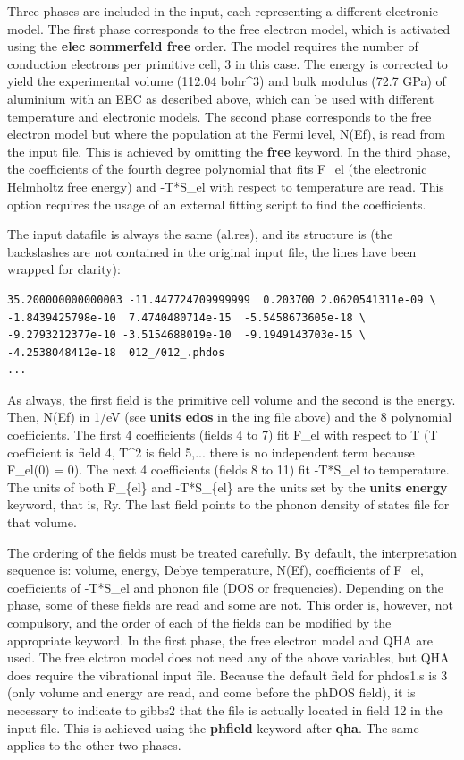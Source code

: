 \documentclass[a4paper]{article}
\begin{document}
Three phases are included in the input, each representing a different
electronic model. The first phase corresponds to the free electron
model, which is activated using the \textbf{elec sommerfeld free}
order. The model requires the number of conduction electrons per
primitive cell, 3 in this case. The energy is corrected to yield the
experimental volume (112.04 bohr\textasciicircum{}3) and bulk modulus (72.7 GPa) of
aluminium with an EEC as described above, which can be used with
different temperature and electronic models. The second phase
corresponds to the free electron model but where the population at the
Fermi level, N(Ef), is read from the input file. This is achieved by
omitting the \textbf{free} keyword. In the third phase, the coefficients of
the fourth degree polynomial that fits F\_el (the electronic Helmholtz
free energy) and -T*S\_el with respect to temperature are read. This
option requires the usage of an external fitting script to find the
coefficients.

The input datafile is always the same (al.res), and its structure is
(the backslashes are not contained in the original input file, the
lines have been wrapped for clarity):
%
\asciilist
\begin{lstlisting}
35.200000000000003 -11.447724709999999  0.203700 2.0620541311e-09 \
-1.8439425798e-10  7.4740480714e-15  -5.5458673605e-18 \
-9.2793212377e-10 -3.5154688019e-10  -9.1949143703e-15 \
-4.2538048412e-18  012_/012_.phdos
...
\end{lstlisting}

As always, the first field is the primitive cell volume and the second
is the energy. Then, N(Ef) in 1/eV (see \textbf{units edos} in the ing
file above) and the 8 polynomial coefficients. The first 4
coefficients (fields 4 to 7) fit F\_el with respect to T (T coefficient
is field 4, T\textasciicircum{}2 is field 5,... there is no independent term because
F\_el(0) = 0). The next 4 coefficients (fields 8 to 11) fit -T*S\_el to
temperature. The units of both F\_\{el\} and -T*S\_\{el\} are the units set
by the \textbf{units energy} keyword, that is, Ry. The last field points to
the phonon density of states file for that volume.

The ordering of the fields must be treated carefully. By default, the
interpretation sequence is: volume, energy, Debye temperature, N(Ef),
coefficients of F\_el, coefficients of -T*S\_el and phonon file (DOS or
frequencies). Depending on the phase, some of these fields are read
and some are not. This order is, however, not compulsory, and the
order of each of the fields can be modified by the appropriate
keyword. In the first phase, the free electron model and QHA are
used. The free elctron model does not need any of the above variables,
but QHA does require the vibrational input file. Because the default
field for phdos1.s is 3 (only volume and energy are read, and come
before the phDOS field), it is necessary to indicate to gibbs2 that
the file is actually located in field 12 in the input file. This is
achieved using the \textbf{phfield} keyword after \textbf{qha}. The same applies
to the other two phases.
\end{document}
